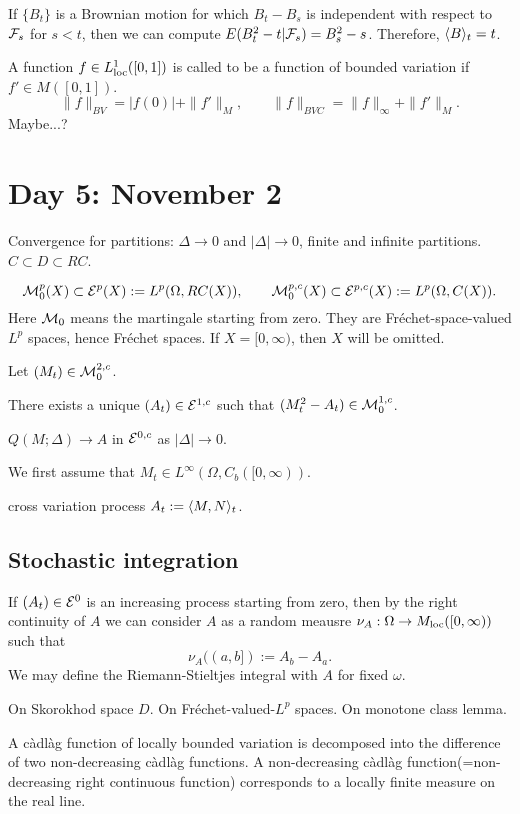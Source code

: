 \documentclass{../../../small}
\begin{document}
\begin{ex}
If $\{B_t\}$ is a Brownian motion for which $B_t-B_s$ is independent with respect to $\mathcal{F}_s$ for $s<t$, then we can compute $E(B_t^2-t|\mathcal{F}_s)=B_s^2-s$.
Therefore, $\langle B\rangle_t=t$.
\end{ex}






A function $f\in L_{\mathrm{loc}}^1([0,1])$ is called to be a function of bounded variation if $f'\in M([0,1])$.
\[\|f\|_{BV}=|f(0)|+\|f'\|_M,\qquad\|f\|_{BVC}=\|f\|_\infty+\|f'\|_M.\]
Maybe...?



\newpage
\section{Day 5: November 2}

Convergence for partitions: $\Delta\to0$ and $|\Delta|\to0$, finite and infinite partitions.
$C\subset D\subset RC$.

\[\mathcal{M}_0^p(X)\subset\mathcal{E}^p(X):=L^p(\Omega,RC(X)),\qquad
\mathcal{M}_0^{p,c}(X)\subset\mathcal{E}^{p,c}(X):=L^p(\Omega,C(X)).\]
Here $\mathcal{M}_0$ means the martingale starting from zero.
They are Fr\'echet-space-valued $L^p$ spaces, hence Fr\'echet spaces.
If $X=[0,\infty)$, then $X$ will be omitted.
\begin{thm}
Let $(M_t)\in\mathcal{M}_0^{2,c}$.
\begin{parts}
\item There exists a unique $(A_t)\in\mathcal{E}^{1,c}$ such that $(M_t^2-A_t)\in\mathcal{M}_0^{1,c}$.
\item $Q(M;\Delta)\to A$ in $\mathcal{E}^{0,c}$ as $|\Delta|\to0$.
\end{parts}
\end{thm}
\begin{pf}
We first assume that $M_t\in L^\infty(\Omega,C_b([0,\infty))$.
\end{pf}


cross variation process $A_t:=\langle M,N\rangle_t$.


\subsection{Stochastic integration}

If $(A_t)\in\mathcal{E}^0$ is an increasing process starting from zero, then by the right continuity of $A$ we can consider $A$ as a random meausre $\nu_A:\Omega\to M_{\mathrm{loc}}([0,\infty))$ such that
\[\nu_A((a,b]):=A_b-A_a.\]
We may define the Riemann-Stieltjes integral with $A$ for fixed $\omega$.


On Skorokhod space $D$.
On Fr\'echet-valued-$L^p$ spaces.
On monotone class lemma.

A c\`adl\`ag function of locally bounded variation is decomposed into the difference of two non-decreasing c\`adl\`ag functions.
A non-decreasing c\`adl\`ag function(=non-decreasing right continuous function) corresponds to a locally finite measure on the real line.
\end{document}
